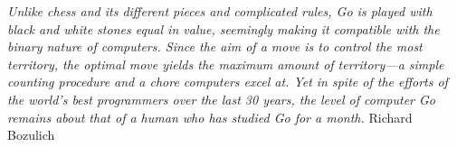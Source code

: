 
{\em Unlike chess and its different pieces and complicated rules, Go is
played with black and white stones equal in value, seemingly making it
compatible with the binary nature of computers. Since the aim of a move is to
control the most territory, the optimal move yields the maximum amount of
territory---a simple counting procedure and a chore computers excel at. Yet
in spite of the efforts of the world's best programmers over the last 30
years, the level of computer Go remains about that of a human who has studied
Go for a month.}
\flushright
Richard Bozulich

